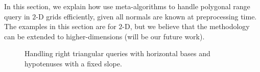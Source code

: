 


In this section, we explain how use meta-algorithms
to handle polygonal range query in $2$-D grids efficiently, given all
normals are known at preprocessing time. The examples in this section are
for $2$-D, but we believe that the methodology can be extended to 
higher-dimensions (will be our future work).


\begin{figure}[t!]
\centering
{}
\hfill
\vspace*{-0.5cm}
\caption{Handling right triangular queries with horizontal bases and hypotenuses with a fixed slope.}
\label{fig:right-triangle}
\end{figure}


